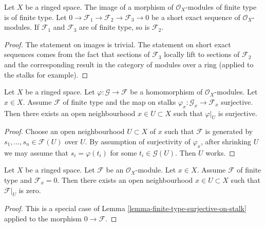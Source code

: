 \begin{lemma}
\label{lemma-extension-finite-type}
Let $X$ be a ringed space.
The image of a morphism of $\mathcal{O}_X$-modules of finite
type is of finite type.
Let
$0 \to \mathcal{F}_1 \to \mathcal{F}_2 \to \mathcal{F}_3 \to 0$
be a short exact sequence of $\mathcal{O}_X$-modules.
If $\mathcal{F}_1$ and $\mathcal{F}_3$ are of finite type,
so is $\mathcal{F}_2$.
\end{lemma}

\begin{proof}
The statement on images is trivial.
The statement on short exact sequences comes from the
fact that sections of $\mathcal{F}_3$ locally lift to sections
of $\mathcal{F}_2$ and the corresponding result in
the category of modules over a ring (applied to the stalks
for example).
\end{proof}

\begin{lemma}
\label{lemma-finite-type-surjective-on-stalk}
\begin{reference}
\cite[Chapter I, \S 2, no. 12, Proposition 1, p. 207]{FAC}
\end{reference}
Let $X$ be a ringed space.
Let $\varphi : \mathcal{G} \to \mathcal{F}$ be a homomorphism
of $\mathcal{O}_X$-modules.
Let $x \in X$. Assume $\mathcal{F}$ of finite type and
the map on stalks
$\varphi_x : \mathcal{G}_x \to \mathcal{F}_x$ surjective.
Then there exists an open neighbourhood
$x \in U \subset X$ such that $\varphi|_U$ is surjective.
\end{lemma}

\begin{proof}
Choose an open neighbourhood $U \subset X$ of $x$ such that $\mathcal{F}$ is
generated by $s_1, \ldots, s_n \in \mathcal{F}(U)$ over $U$.
By assumption of surjectivity of $\varphi_x$,
after shrinking $U$ we may assume that $s_i = \varphi(t_i)$
for some $t_i \in \mathcal{G}(U)$.
Then $U$ works.
\end{proof}

\begin{lemma}
\label{lemma-finite-type-stalk-zero}
Let $X$ be a ringed space.
Let $\mathcal{F}$ be an $\mathcal{O}_X$-module.
Let $x \in X$.
Assume $\mathcal{F}$ of finite type and $\mathcal{F}_x = 0$.
Then there exists an open neighbourhood
$x \in U \subset X$ such that $\mathcal{F}|_U$ is zero.
\end{lemma}

\begin{proof}
This is a special case of
Lemma \ref{lemma-finite-type-surjective-on-stalk}
applied to the morphism $0 \to \mathcal{F}$.
\end{proof}

